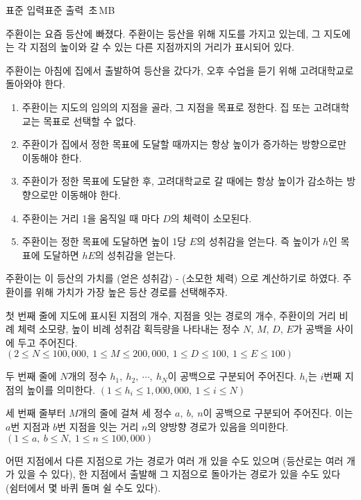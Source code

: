 \begin{problem}{\kcpcclimbingtitle}
    {표준 입력}{표준 출력}
    {\kcpcclimbingtime\,초}{\kcpcclimbingmemory\,MB}{}{\kcpcclimbingscore}
    
    주환이는 요즘 등산에 빠졌다. 주환이는 등산을 위해 지도를 가지고 있는데, 그 지도에는 각 지점의 높이와 갈 수 있는 다른 지점까지의 거리가 표시되어 있다.
    
    주환이는 아침에 집에서 출발하여 등산을 갔다가, 오후 수업을 듣기 위해 고려대학교로 돌아와야 한다.
    
    \begin{enumerate}[label=\Alph*.]
        \item 주환이는 지도의 임의의 지점을 골라, 그 지점을 목표로 정한다. 집 또는 고려대학교는 목표로 선택할 수 없다.
        \item 주환이가 집에서 정한 목표에 도달할 때까지는 항상 높이가 증가하는 방향으로만 이동해야 한다.
        \item 주환이가 정한 목표에 도달한 후, 고려대학교로 갈 때에는 항상 높이가 감소하는 방향으로만 이동해야 한다.
        \item 주환이는 거리 1을 움직일 때 마다 $ D $의 체력이 소모된다.
        \item 주환이는 정한 목표에 도달하면 높이 1당 $ E $의 성취감을 얻는다. 즉 높이가 $ h $인 목표에 도달하면 $ hE $의 성취감을 얻는다.
    \end{enumerate}
    주환이는 이 등산의 가치를 (얻은 성취감) - (소모한 체력) 으로 계산하기로 하였다. 주환이를 위해 가치가 가장 높은 등산 경로를 선택해주자.
    
    \InputFile
    
    첫 번째 줄에 지도에 표시된 지점의 개수, 지점을 잇는 경로의 개수, 주환이의 거리 비례 체력 소모량, 높이 비례 성취감 획득량을 나타내는 정수 $ N $, $ M $, $ D $, $ E $가 공백을 사이에 두고 주어진다. $ (2 \leq N \leq 100,000,\ 1 \leq M \leq 200,000,\ 1 \leq D \leq 100,\ 1 \leq  E \leq 100) $
    
    두 번째 줄에 $ N $개의 정수 $ h_1,\ h_2,\ \cdots ,\ h_N $이 공백으로 구분되어 주어진다. $ h_i $는 $ i $번째 지점의 높이를 의미한다. $ (1 \leq h_i \leq 1,000,000,\ 1 \leq i \leq N) $
    
    세 번째 줄부터 $ M $개의 줄에 걸쳐 세 정수 $ a,\ b,\ n $이 공백으로 구분되어 주어진다. 이는 $ a $번 지점과 $ b $번 지점을 잇는 거리 $ n $의 양방향 경로가 있음을 의미한다. $ (1 \leq a,\ b \leq N,\ 1 \leq n \leq 100,000) $
    
    어떤 지점에서 다른 지점으로 가는 경로가 여러 개 있을 수도 있으며 (등산로는 여러 개가 있을 수 있다), 한 지점에서 출발해 그 지점으로 돌아가는 경로가 있을 수도 있다 (쉼터에서 몇 바퀴 돌며 쉴 수도 있다).
    

\end{problem}
